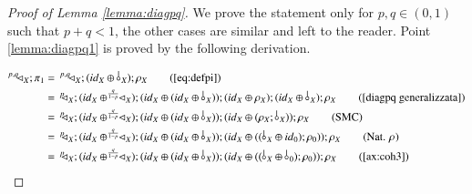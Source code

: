\begin{proof}[Proof of Lemma \ref{lemma:diagpq}] 
We prove the statement only for $p,q\in(0,1)$ such that $p+q<1$, the other cases are similar and left to the reader.
Point \eqref{lemma:diagpq1} is proved by the following derivation.

    \begin{align}
        \diaggen{p,q\,}{X};\pi_1 
        &=\, \diaggen{p,q\,}{X};(\id{X}\oplus \bang{X});\runit{X} \tag{\eqref{eq:defpi}}\\
         & =\, \diagp{X};(\id{X}\oplus \diaggen{\frac{q}{1-p}}{X});(\id{X}\oplus (\id{X} \oplus\bang{X}));(\id{X}\oplus \runit{X});(\id{X}\oplus \bang{X});\runit{X} \tag{\eqref{diagpq generalizzata}}\\
         &= \, \diagp{X};(\id{X}\oplus \diaggen{\frac{q}{1-p}}{X});(\id{X}\oplus (\id{X} \oplus\bang{X}));(\id{X}\oplus (\runit{X};\,\bangp{X}));\runit{X} \tag{SMC}\\
         &= \, \diagp{X};(\id{X}\oplus \diaggen{\frac{q}{1-p}}{X});(\id{X}\oplus (\id{X} \oplus\bang{X}));(\id{X}\oplus ((\,\bangp{X}\oplus \id{0});\runit{0}));\runit{X} \tag{Nat. $\runit{}$}\\
         &= \, \diagp{X};(\id{X}\oplus \diaggen{\frac{q}{1-p}}{X});(\id{X}\oplus (\id{X} \oplus\bang{X}));(\id{X}\oplus ((\,\bangp{X}\oplus\, \bangp{0});\runit{0}));\runit{X} \tag{\ref{ax:coh3}}\\

\end{align}
\end{proof}
